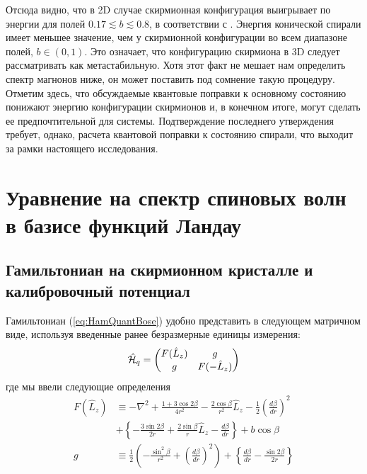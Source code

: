 \documentclass[a4paper,article,14pt]{extarticle}
\begin{document}
Отсюда видно, что в 2D случае скирмионная конфигурация выигрывает по энергии для полей  $0.17 \lesssim b \lesssim 0.8$, в соответствии с \cite{Rybakov2015}.
Энергия конической спирали имеет меньшее значение, чем у скирмионной конфигурации во всем диапазоне полей, $b \in (0,1)$. Это означает, что конфигурацию скирмиона в 3D следует рассматривать как метастабильную. Хотя этот факт не мешает нам определить спектр магнонов ниже, он может поставить под сомнение такую процедуру. Отметим здесь, что обсуждаемые квантовые поправки к основному состоянию понижают энергию конфигурации скирмионов и, в конечном итоге, могут сделать ее предпочтительной для системы. Подтверждение последнего утверждения требует, однако, расчета квантовой поправки к состоянию спирали, что выходит за рамки настоящего исследования.


\pagebreak
\section{Уравнение на спектр спиновых волн в базисе функций Ландау}

\subsection{Гамильтониан на скирмионном кристалле и калибровочный потенциал}

Гамильтониан (\ref{eq:HamQuantBose}) удобно представить в следующем матричном виде, используя введенные ранее безразмерные единицы измерения:
\begin{equation}
\label{eq:HamQuantBoseDimensionless}
\hat {\cal H}_{q} =\begin{pmatrix} F(\hat  L_{z}) &g \\ g & F(  - \hat  L_{z} ) \end{pmatrix}
\end{equation}
где мы ввели следующие определения
$$
\begin{aligned} 
F  (\hat  L_{z} )&\equiv   - \nabla^{2}  + \frac{1 + 3\cos 2\beta }{4r^2} - \frac{2\cos \beta }{r^2}\hat{L}_{z} - \frac{1}{2}\left( \frac{d\beta }{dr} \right)^2  \\
& +  \left\{  - \frac{3\sin 2\beta }{2r} + \frac{2\sin \beta }{r}\hat{L}_{z}  - \frac{d\beta }{dr} \right\} + b\cos \beta   \\ 
g &\equiv \frac{1}{2}\left(  - \frac{\sin ^2\beta }{r^2} + \left( \frac{d\beta }{dr} \right)^2 \right) 
+ \left\{ \frac{d\beta }{dr} - \frac{\sin 2\beta }{2r} \right\}
\end{aligned}  
$$
\end{document}

